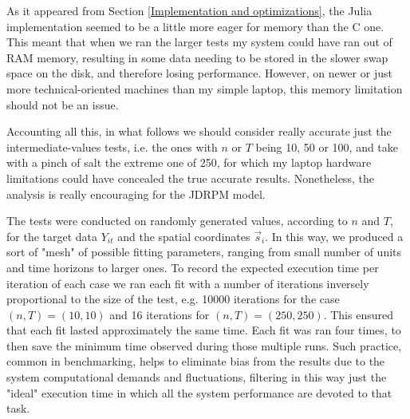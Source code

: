 \documentclass[12pt,	%
	a4paper,		%
	twoside,		%
	openright,		%
	titlepage,%
	]{book}
\theoremstyle{definition}
\newcommand{\mjline}[1]{\texttt{#1}}
\begin{document}
As it appeared from Section \ref{Implementation and optimizations}, the Julia implementation seemed to be a little more eager for memory than the C one. This meant that when we ran the larger tests my system could have ran out of RAM memory, resulting in some data needing to be stored in the slower swap space on the disk, and therefore losing performance. However, on newer or just more technical-oriented machines than my simple laptop, this memory limitation should not be an issue.

Accounting all this, in what follows we should consider really accurate just the intermediate-values tests, i.e. the ones with $n$ or $T$ being 10, 50 or 100, and take with a pinch of salt the extreme one of 250, for which my laptop hardware limitations could have concealed the true accurate results. Nonetheless, the analysis is really encouraging for the JDRPM model.


The tests were conducted on randomly generated values, according to $n$ and $T$, for the target data $Y_{it}$ and the spatial coordinates $\vec{s}_i$. In this way, we produced a sort of "mesh" of possible fitting parameters, ranging from small number of units and time horizons to larger ones. To record the expected execution time per iteration of each case we ran each fit with a number of iterations inversely proportional to the size of the test, e.g. 10000 iterations for the case $(n,T)=(10,10)$ and 16 iterations for $(n,T) = (250,250)$. This ensured that each fit lasted approximately the same time. Each fit was ran four times, to then save the minimum time observed during those multiple runs. Such practice, common in benchmarking, helps to eliminate bias from the results due to the system computational demands and fluctuations, filtering in this way just the "ideal" execution time in which all the system performance are devoted to that task.
\end{document}
